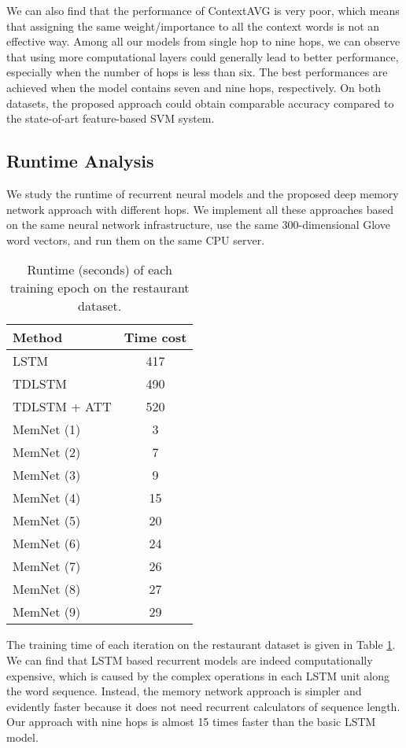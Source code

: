 \documentclass[11pt,letterpaper]{article}
\begin{document}
We can also find that the performance of ContextAVG is very poor, which means that assigning the same weight/importance to all the context words is not an effective way. 
Among all our models from single hop to nine hops, we can observe that using more computational layers could generally lead to better performance, especially when the number of hops is less than six.
The best performances are achieved when the model contains seven and nine hops, respectively. 
On both datasets, the proposed approach could obtain comparable accuracy compared to the state-of-art feature-based SVM system. 


\subsection{Runtime Analysis}
We study the runtime of recurrent neural models and the proposed deep memory network approach with different hops. 
We implement all these approaches based on the same neural network infrastructure, use the same 300-dimensional Glove word vectors, and run them on the same CPU server. 

\begin{table}[h]
	\centering
	\begin{tabular}{l|c}
		\hline
		Method & Time cost\\
		\hline
		LSTM & 417 \\
		TDLSTM & 490 \\
		TDLSTM + ATT & 520 \\
		\hline
		MemNet (1) & 3 \\
		MemNet (2)& 7\\
		MemNet (3)& 9 \\
		MemNet (4)& 15\\
		MemNet (5)& 20\\
		MemNet (6)& 24\\
		MemNet (7)& 26\\
		MemNet (8)& 27\\
		MemNet (9)& 29\\
		\hline
	\end{tabular}
	\caption{Runtime (seconds) of each training epoch on the restaurant dataset.}
	\label{table:time-cost}
\end{table}
The training time of each iteration on the restaurant dataset is given in Table \ref{table:time-cost}. 
We can find that LSTM based recurrent models are indeed computationally expensive, which is caused by the complex operations in each LSTM unit along the word sequence. 
Instead, the memory network approach is simpler and evidently faster because it does not need recurrent calculators of sequence length.
Our approach with nine hops is almost 15 times faster than the basic LSTM model. 
\end{document}
